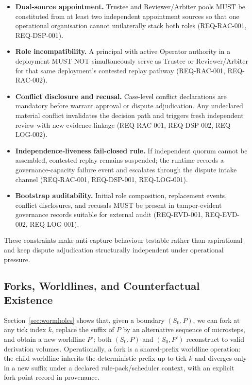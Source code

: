 \documentclass[11pt]{article}
\theoremstyle{definition}
\theoremstyle{plain}
\theoremstyle{remark}
\begin{document}
\begin{itemize}[leftmargin=*]
  \item \textbf{Dual-source appointment.}
  Trustee and Reviewer/Arbiter pools MUST be constituted from at least two independent appointment
  sources so that one operational organisation cannot unilaterally stack both roles
  (REQ-RAC-001, REQ-DSP-001).
  \item \textbf{Role incompatibility.}
  A principal with active Operator authority in a deployment MUST NOT simultaneously serve as Trustee
  or Reviewer/Arbiter for that same deployment's contested replay pathway
  (REQ-RAC-001, REQ-RAC-002).
  \item \textbf{Conflict disclosure and recusal.}
  Case-level conflict declarations are mandatory before warrant approval or dispute adjudication.
  Any undeclared material conflict invalidates the decision path and triggers fresh independent review
  with new evidence linkage (REQ-RAC-001, REQ-DSP-002, REQ-LOG-002).
  \item \textbf{Independence-liveness fail-closed rule.}
  If independent quorum cannot be assembled, contested replay remains suspended; the runtime records a
  governance-capacity failure event and escalates through the dispute intake channel
  (REQ-RAC-001, REQ-DSP-001, REQ-LOG-001).
  \item \textbf{Bootstrap auditability.}
  Initial role composition, replacement events, conflict disclosures, and recusals MUST be present in
  tamper-evident governance records suitable for external audit
  (REQ-EVD-001, REQ-EVD-002, REQ-LOG-001).
\end{itemize}

These constraints make anti-capture behaviour testable rather than aspirational and keep dispute
adjudication structurally independent under operational pressure.

\subsection{Forks, Worldlines, and Counterfactual Existence}

Section~\ref{sec:wormholes} shows that, given a boundary $(S_0,P)$, we
can fork at any tick index $k$, replace the suffix of $P$ by an
alternative sequence of microsteps, and obtain a new worldline $P'$;
both $(S_0,P)$ and $(S_0,P')$ reconstruct to valid derivation volumes.
Operationally, a fork is a shared-prefix worldline operation: the child worldline inherits
the deterministic prefix up to tick $k$ and diverges only in a new suffix under a declared
rule-pack/scheduler context, with an explicit fork-point record in provenance.
\end{document}

